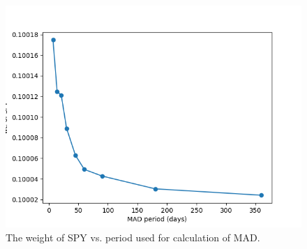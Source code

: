 \documentclass{article}
\begin{document}
\begin{figure}
\includegraphics[scale=0.9,bb=0 0 640 480]{figures/mad-sensitivity-period-SPY.png}
\caption{The weight of SPY vs. period used for calculation of MAD.}
\label{fig:mad-period-sensitivity}
\end{figure}

\clearpage



\end{document}
